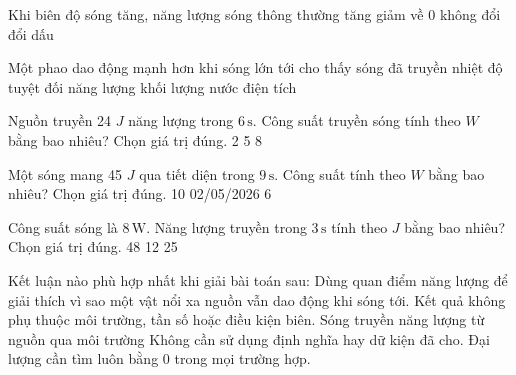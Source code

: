 \begin{ex}
Khi biên độ sóng tăng, năng lượng sóng thông thường
\choice
{\True tăng}
{giảm về 0}
{không đổi}
{đổi dấu}
\end{ex}

\begin{ex}
Một phao dao động mạnh hơn khi sóng lớn tới cho thấy sóng đã truyền
\choice
{nhiệt độ tuyệt đối}
{\True năng lượng}
{khối lượng nước}
{điện tích}
\end{ex}

\begin{ex}
Nguồn truyền 24 $J$ năng lượng trong $6\,\text{s}$. Công suất truyền sóng tính theo $W$ bằng bao nhiêu? Chọn giá trị đúng.
\choice
{2}
{5}
{}
{8}
\end{ex}

\begin{ex}
Một sóng mang 45 $J$ qua tiết diện trong $9\,\text{s}$. Công suất tính theo $W$ bằng bao nhiêu? Chọn giá trị đúng.
\choice
{10}
{02/05/2026}
{6}
{}
\end{ex}

\begin{ex}
Công suất sóng là $8\,\text{W}$. Năng lượng truyền trong $3\,\text{s}$ tính theo $J$ bằng bao nhiêu? Chọn giá trị đúng.
\choice
{}
{48}
{12}
{25}
\end{ex}

\begin{ex}
Kết luận nào phù hợp nhất khi giải bài toán sau: Dùng quan điểm năng lượng để giải thích vì sao một vật nổi xa nguồn vẫn dao động khi sóng tới.
\choice
{Kết quả không phụ thuộc môi trường, tần số hoặc điều kiện biên.}
{\True Sóng truyền năng lượng từ nguồn qua môi trường}
{Không cần sử dụng định nghĩa hay dữ kiện đã cho.}
{Đại lượng cần tìm luôn bằng 0 trong mọi trường hợp.}
\end{ex}


